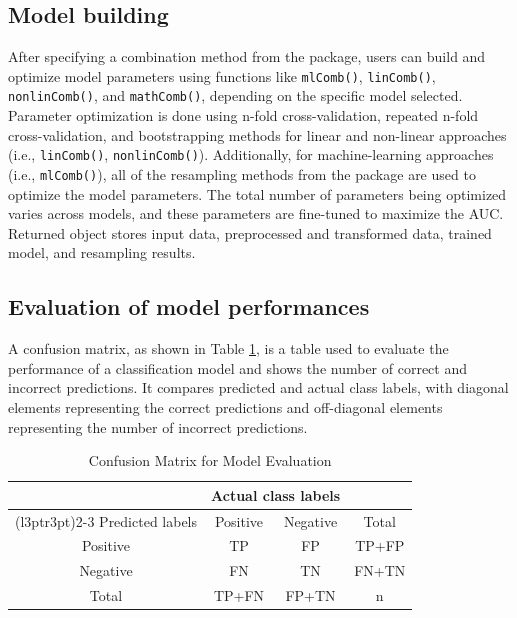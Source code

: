 \subsection{Model building}\label{model-building}

After specifying a combination method from the  package, users can build and optimize model parameters using functions like \texttt{mlComb()}, \texttt{linComb()}, \texttt{nonlinComb()}, and \texttt{mathComb()}, depending on the specific model selected. Parameter optimization is done using n-fold cross-validation, repeated n-fold cross-validation, and bootstrapping methods for linear and non-linear approaches (i.e., \texttt{linComb()}, \texttt{nonlinComb()}). Additionally, for machine-learning approaches (i.e., \texttt{mlComb()}), all of the resampling methods from the  package are used to optimize the model parameters. The total number of parameters being optimized varies across models, and these parameters are fine-tuned to maximize the AUC. Returned object stores input data, preprocessed and transformed data, trained model, and resampling results.

\subsection{Evaluation of model performances}\label{evaluation-of-model-performances}

A confusion matrix, as shown in Table \ref{tab:confusion-matrix}, is a table used to evaluate the performance of a classification model and shows the number of correct and incorrect predictions. It compares predicted and actual class labels, with diagonal elements representing the correct predictions and off-diagonal elements representing the number of incorrect predictions.

\begin{table}[!h]
\centering
\caption{\label{tab:confusion-matrix}Confusion Matrix for Model Evaluation}
\centering
\begin{tabular}[t]{cccc}
\toprule
\multicolumn{1}{c}{ } & \multicolumn{2}{c}{Actual class labels} & \multicolumn{1}{c}{ } \\
\cmidrule(l{3pt}r{3pt}){2-3}
Predicted labels & Positive & Negative & Total\\
\midrule
Positive & TP & FP & TP+FP\\
Negative & FN & TN & FN+TN\\
Total & TP+FN & FP+TN & n\\
\bottomrule
\end{tabular}
\end{table}

